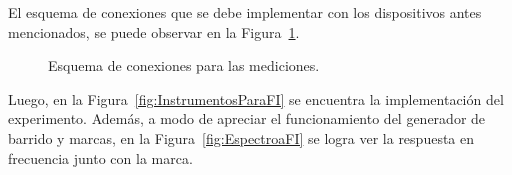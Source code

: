     El esquema de conexiones que se debe implementar con los dispositivos antes mencionados, se puede observar en
    la Figura~\ref{fig:EsquemaConexiones}. 

    \begin{figure}[H]
      \centering
      \caption{Esquema de conexiones para las mediciones.}
      \label{fig:EsquemaConexiones}
    \end{figure}

    Luego, en la Figura~\ref{fig:InstrumentosParaFI} se encuentra la implementación del experimento. Además, a 
    modo de apreciar el funcionamiento del generador de barrido y marcas, en la Figura~\ref{fig:EspectroaFI} se 
    logra ver la respuesta en frecuencia junto con la marca.

